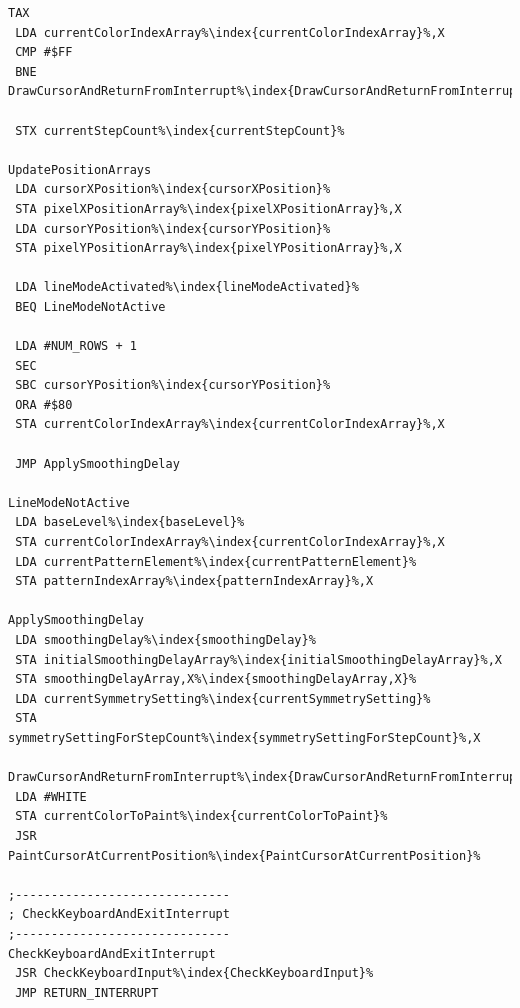\begin{minipage}[b]{0.33\linewidth}
\begin{lrbox}{\mybox}
\begin{lstlisting}[basicstyle=\ttfamily\tiny,escapechar=\%]
 TAX
 LDA currentColorIndexArray%\index{currentColorIndexArray}%,X
 CMP #$FF
 BNE DrawCursorAndReturnFromInterrupt%\index{DrawCursorAndReturnFromInterrupt}%

 STX currentStepCount%\index{currentStepCount}%

UpdatePositionArrays
 LDA cursorXPosition%\index{cursorXPosition}%
 STA pixelXPositionArray%\index{pixelXPositionArray}%,X
 LDA cursorYPosition%\index{cursorYPosition}%
 STA pixelYPositionArray%\index{pixelYPositionArray}%,X

 LDA lineModeActivated%\index{lineModeActivated}%
 BEQ LineModeNotActive

 LDA #NUM_ROWS + 1
 SEC
 SBC cursorYPosition%\index{cursorYPosition}%
 ORA #$80
 STA currentColorIndexArray%\index{currentColorIndexArray}%,X

 JMP ApplySmoothingDelay

LineModeNotActive
 LDA baseLevel%\index{baseLevel}%
 STA currentColorIndexArray%\index{currentColorIndexArray}%,X
 LDA currentPatternElement%\index{currentPatternElement}%
 STA patternIndexArray%\index{patternIndexArray}%,X

ApplySmoothingDelay
 LDA smoothingDelay%\index{smoothingDelay}%
 STA initialSmoothingDelayArray%\index{initialSmoothingDelayArray}%,X
 STA smoothingDelayArray,X%\index{smoothingDelayArray,X}%
 LDA currentSymmetrySetting%\index{currentSymmetrySetting}%
 STA symmetrySettingForStepCount%\index{symmetrySettingForStepCount}%,X

DrawCursorAndReturnFromInterrupt%\index{DrawCursorAndReturnFromInterrupt}%
 LDA #WHITE
 STA currentColorToPaint%\index{currentColorToPaint}%
 JSR PaintCursorAtCurrentPosition%\index{PaintCursorAtCurrentPosition}%

;------------------------------
; CheckKeyboardAndExitInterrupt
;------------------------------
CheckKeyboardAndExitInterrupt
 JSR CheckKeyboardInput%\index{CheckKeyboardInput}%
 JMP RETURN_INTERRUPT
\end{lstlisting}
\end{lrbox}%
\scalebox{0.8}{\usebox{\mybox}}
\end{minipage}
\hspace{-0.1cm}
